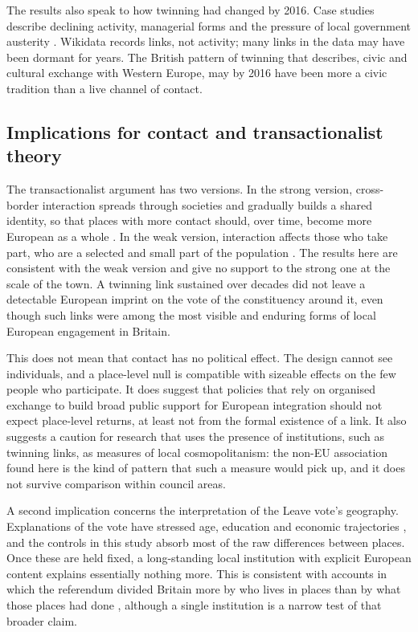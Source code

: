 \documentclass[11pt,a4paper]{article}
\begin{document}
The results also speak to how twinning had changed by 2016. Case studies describe declining activity, managerial forms and the pressure of local government austerity \citep{falkenhain2012,langenohl2023,warwick2024}. Wikidata records links, not activity; many links in the data may have been dormant for years. The British pattern of twinning that \citet{clarke2010} describes, civic and cultural exchange with Western Europe, may by 2016 have been more a civic tradition than a live channel of contact.


\subsection{Implications for contact and transactionalist theory}
The transactionalist argument has two versions. In the strong version, cross-border interaction spreads through societies and gradually builds a shared identity, so that places with more contact should, over time, become more European as a whole \citep{deutsch1957}. In the weak version, interaction affects those who take part, who are a selected and small part of the population \citep{fligstein2008,kuhn2011,kuhn2015}. The results here are consistent with the weak version and give no support to the strong one at the scale of the town. A twinning link sustained over decades did not leave a detectable European imprint on the vote of the constituency around it, even though such links were among the most visible and enduring forms of local European engagement in Britain.

This does not mean that contact has no political effect. The design cannot see individuals, and a place-level null is compatible with sizeable effects on the few people who participate. It does suggest that policies that rely on organised exchange to build broad public support for European integration should not expect place-level returns, at least not from the formal existence of a link. It also suggests a caution for research that uses the presence of institutions, such as twinning links, as measures of local cosmopolitanism: the non-EU association found here is the kind of pattern that such a measure would pick up, and it does not survive comparison within council areas.

A second implication concerns the interpretation of the Leave vote's geography. Explanations of the vote have stressed age, education and economic trajectories \citep{becker2017,jennings2016}, and the controls in this study absorb most of the raw differences between places. Once these are held fixed, a long-standing local institution with explicit European content explains essentially nothing more. This is consistent with accounts in which the referendum divided Britain more by who lives in places than by what those places had done \citep{hobolt2016,johnston2018}, although a single institution is a narrow test of that broader claim.
\end{document}
